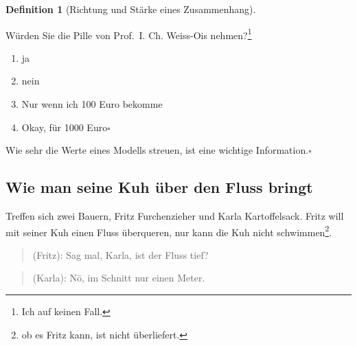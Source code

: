 \documentclass[
  a4paper,
  DIV=11]{scrreprt}
\providecommand{\tightlist}{%
  \setlength{\itemsep}{0pt}\setlength{\parskip}{0pt}}\usepackage{longtable,booktabs,array}
\theoremstyle{definition}
\theoremstyle{definition}
\theoremstyle{definition}
\newtheorem{definition}{Definition}[chapter]
\theoremstyle{remark}
\begin{document}
\begin{definition}[Richtung und Stärke eines
Zusammenhang]
\begin{figure}
\begin{minipage}{0.45\linewidth}
\begin{figure}[H]
\end{figure}%

\end{minipage}%

\end{figure}%

Würden Sie die Pille von Prof.~I. Ch. Weiss-Ois nehmen?\footnote{Ich auf
  keinen Fall.}

\begin{enumerate}
\def\labelenumi{\alph{enumi})}
\tightlist
\item
  ja
\item
  nein
\item
  Nur wenn ich 100 Euro bekomme
\item
  Okay, für 1000 Euro\(\square\)
\end{enumerate}

\begin{tcolorbox}[enhanced jigsaw, leftrule=.75mm, opacitybacktitle=0.6, colback=white, colframe=quarto-callout-important-color-frame, coltitle=black, colbacktitle=quarto-callout-important-color!10!white, opacityback=0, left=2mm, breakable, titlerule=0mm, toptitle=1mm, bottomtitle=1mm, rightrule=.15mm, title=\textcolor{quarto-callout-important-color}{\faExclamation}\hspace{0.5em}{Wichtig}, arc=.35mm, bottomrule=.15mm, toprule=.15mm]

Wie sehr die Werte eines Modells streuen, ist eine wichtige
Information.\(\square\)

\end{tcolorbox}

\subsection{Wie man seine Kuh über den Fluss
bringt}\label{wie-man-seine-kuh-uxfcber-den-fluss-bringt}

Treffen sich zwei Bauern, Fritz Furchenzieher und Karla Kartoffelsack.
Fritz will mit seiner Kuh einen Fluss überqueren, nur kann die Kuh nicht
schwimmen\footnote{ob es Fritz kann, ist nicht überliefert.}.

\begin{quote}
{} (Fritz): Sag mal, Karla, ist der Fluss tief?
\end{quote}

\begin{quote}
{} (Karla): Nö, im Schnitt nur einen Meter.
\end{quote}


\end{definition}
\end{document}
